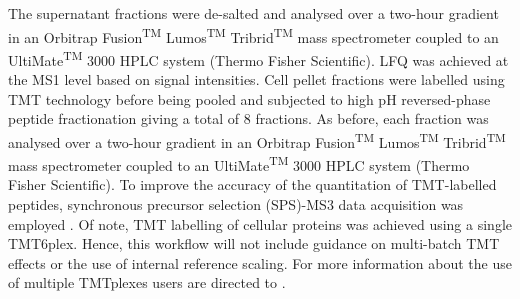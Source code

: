 \documentclass[9pt,a4paper,]{extarticle}
\begin{document}
The supernatant fractions were de-salted and analysed over a two-hour gradient
in an Orbitrap Fusion\textsuperscript{TM} Lumos\textsuperscript{TM} Tribrid\textsuperscript{TM} mass spectrometer coupled to an
UltiMate\textsuperscript{TM} 3000 HPLC system (Thermo Fisher Scientific). LFQ was achieved at the
MS1 level based on signal intensities. Cell pellet fractions were labelled using
TMT technology before being pooled and subjected to high pH reversed-phase peptide
fractionation giving a total of 8 fractions. As before, each fraction was
analysed over a two-hour gradient in an Orbitrap Fusion\textsuperscript{TM} Lumos\textsuperscript{TM} Tribrid\textsuperscript{TM}
mass spectrometer coupled to an UltiMate\textsuperscript{TM} 3000 HPLC system (Thermo Fisher
Scientific). To improve the accuracy of the quantitation of TMT-labelled peptides,
synchronous precursor selection (SPS)-MS3 data acquisition was employed
\citep{McAlister2014, Ting2011}. Of note, TMT labelling of cellular proteins was
achieved using a single TMT6plex. Hence, this workflow will not include guidance
on multi-batch TMT effects or the use of internal reference scaling. For more
information about the use of multiple TMTplexes users are directed to \citep{Plubell2017, Brenes2019}.
\end{document}
